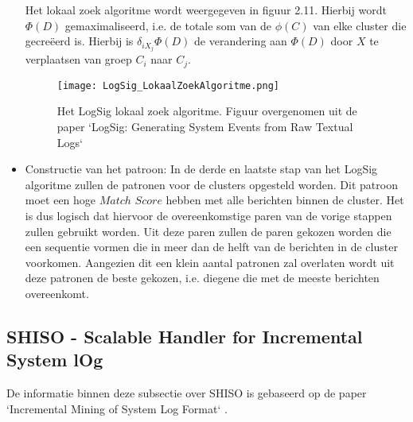 \begin{itemize}
    Het lokaal zoek algoritme wordt weergegeven in figuur 2.11. Hierbij wordt $\Phi(D)$ gemaximaliseerd, i.e. de totale som van de $\phi(C)$ van elke cluster die gecreëerd is. Hierbij is \(\delta_{iX_{j}} \Phi(D)\) de verandering aan $\Phi(D)$ door $X$ te verplaatsen van groep $C_{i}$ naar $C_{j}$.
    
    \begin{figure}[!htp]
        \texttt{[image: LogSig\_LokaalZoekAlgoritme.png]}
        \caption{Het LogSig lokaal zoek algoritme. Figuur overgenomen uit de paper `LogSig: Generating System Events from Raw Textual Logs` \autocite{tang2011logsig}}
    \end{figure}
    
    \item Constructie van het patroon: In de derde en laatste stap van het LogSig algoritme zullen de patronen voor de clusters opgesteld worden. Dit patroon moet een hoge $Match$ $Score$ hebben met alle berichten binnen de cluster. Het is dus logisch dat hiervoor de overeenkomstige paren van de vorige stappen zullen gebruikt worden. Uit deze paren zullen de paren gekozen worden die een sequentie vormen die in meer dan de helft van de berichten in de cluster voorkomen. Aangezien dit een klein aantal patronen zal overlaten wordt uit deze patronen de beste gekozen, i.e. diegene die met de meeste berichten overeenkomt.
\end{itemize}

\subsection{SHISO - Scalable Handler for Incremental System lOg}
De informatie binnen deze subsectie over SHISO is gebaseerd op de paper `Incremental Mining of System Log Format` \autocite{mizutani2013incremental}.

